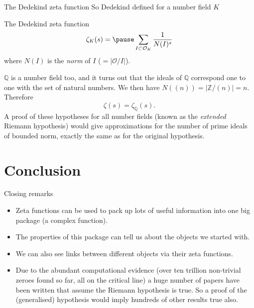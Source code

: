 \documentclass{beamer}
\begin{document}
\begin{frame}{The Dedekind zeta function}
So Dedekind defined for a number field $K$
\begin{block}{The Dedekind zeta function}
\[\zeta_K(s) = \pause \sum_{I\subset \mathcal{O}_K} \frac{1}{N(I)^s}\]
where $N(I)$ is the \emph{norm} of $I$ ($ = |\mathcal{O}/I|$). 
\end{block}
\pause $\mathbb{Q}$ is a number field too, and it turns out that the ideals of $\mathbb{Q}$ correspond one to one with the set of natural numbers.
We then have $N((n)) = |\mathbb{Z}/(n)| = n$.
\pause Therefore
\[\zeta(s) = \zeta_\mathbb{Q}(s).\]
\pause A proof of these hypotheses for all number fields (known as the \emph{extended} Riemann hypothesis) would give approximations for the number of prime ideals of bounded norm, exactly the same as for the original hypothesis.
\end{frame}

\section{Conclusion}
\begin{frame}{Closing remarks}
\begin{itemize}
\item Zeta functions can be used to pack up lots of useful information into one big package (a complex function).
\pause\item The properties of this package can tell us about the objects we started with.
\pause\item We can also see links between different objects via their zeta functions.
\pause\item Due to the abundant computational evidence (over ten trillion non-trivial zeroes found so far, all on the critical line) a huge number of papers have been written that assume the Riemann hypothesis is true.
So a proof of the (generalised) hypothesis would imply hundreds of other results true also.
\end{itemize}
\end{frame}
\end{document}

